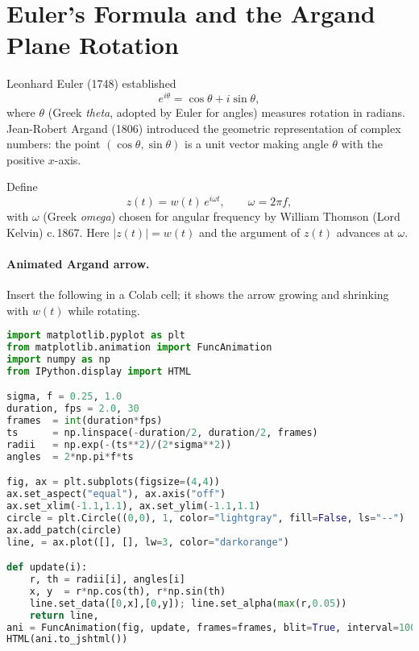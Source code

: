 \documentclass[11pt]{article}
\begin{document}
\section{Euler’s Formula and the Argand Plane Rotation}

Leonhard Euler (1748) established
\[
e^{i\theta} = \cos\theta + i\sin\theta,
\]
where \( \theta \) (Greek \emph{theta}, adopted by Euler for angles)
measures rotation in radians.  Jean-Robert Argand (1806) introduced the
geometric representation of complex numbers: the point
\( (\cos\theta,\sin\theta) \) is a unit vector making angle \( \theta \)
with the positive \(x\)-axis.

Define
\[
z(t) = w(t)\,e^{i\omega t},\qquad \omega = 2\pi f,
\]
with \( \omega \) (Greek \emph{omega}) chosen for angular frequency by
William Thomson (Lord Kelvin) c.\,1867.  Here \( |z(t)| = w(t) \) and the
argument of \(z(t)\) advances at \(\omega\).

\paragraph{Animated Argand arrow.}
Insert the following in a Colab cell; it shows the arrow growing and
shrinking with \(w(t)\) while rotating.

\begin{lstlisting}[language=Python,caption={Argand rotation with Gaussian magnitude}]
import matplotlib.pyplot as plt
from matplotlib.animation import FuncAnimation
import numpy as np
from IPython.display import HTML

sigma, f = 0.25, 1.0
duration, fps = 2.0, 30
frames  = int(duration*fps)
ts      = np.linspace(-duration/2, duration/2, frames)
radii   = np.exp(-(ts**2)/(2*sigma**2))
angles  = 2*np.pi*f*ts

fig, ax = plt.subplots(figsize=(4,4))
ax.set_aspect("equal"), ax.axis("off")
ax.set_xlim(-1.1,1.1), ax.set_ylim(-1.1,1.1)
circle = plt.Circle((0,0), 1, color="lightgray", fill=False, ls="--")
ax.add_patch(circle)
line, = ax.plot([], [], lw=3, color="darkorange")

def update(i):
    r, th = radii[i], angles[i]
    x, y  = r*np.cos(th), r*np.sin(th)
    line.set_data([0,x],[0,y]); line.set_alpha(max(r,0.05))
    return line,
ani = FuncAnimation(fig, update, frames=frames, blit=True, interval=1000/fps)
HTML(ani.to_jshtml())
\end{lstlisting}
\end{document}
